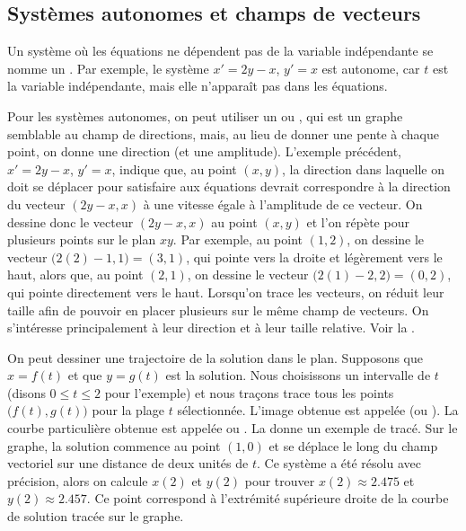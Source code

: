 \subsection{Systèmes autonomes et champs de vecteurs}

Un système où les équations ne dépendent pas de la variable indépendante se nomme un \emph{}. Par exemple, le système $x'=2y-x$, $y'=x$ est autonome, car $t$ est la variable indépendante, mais elle n'apparaît pas dans les équations.

Pour les systèmes autonomes, on peut utiliser un
\emph{} ou \emph{},
qui est un graphe semblable au champ de directions, mais, au lieu de donner une pente à chaque point, on donne une direction (et une amplitude). L'exemple précédent, $x' = 2y-x$, $y' = x$, indique que, au point $(x,y)$, la direction dans laquelle on doit se déplacer pour satisfaire aux équations devrait correspondre à la direction du vecteur $( 2y-x, x )$
à une vitesse égale à l'amplitude de ce vecteur. On dessine donc le vecteur $(2y-x,x)$ au point $(x,y)$ et l'on répète pour plusieurs points sur le plan $xy$.
Par exemple, au point $(1,2)$, on dessine le vecteur
$\bigl(2(2)-1,1\bigr) = (3,1)$,
qui pointe vers la droite et légèrement vers le haut, alors que, au point $(2,1)$, on dessine le vecteur $\bigl(2(1)-2,2\bigr) = (0,2)$,
qui pointe directement vers le haut.
Lorsqu'on trace les vecteurs, on réduit leur taille afin de pouvoir en placer plusieurs sur le même champ de vecteurs. On s'intéresse principalement à leur direction et à leur taille relative. Voir la
.

On peut dessiner une trajectoire de la solution dans le plan. Supposons que $x = f(t)$ et que $y=g(t)$ est la solution. Nous choisissons un intervalle de $t$ (disons $0 \leq t \leq 2$ pour l'exemple) et nous traçons trace tous les points
$\bigl(f(t),g(t)\bigr)$ pour la plage $t$ sélectionnée. L'image obtenue est appelée \emph{}
(ou \emph{}).
La courbe particulière obtenue est appelée \emph{} ou \emph{}.
La  donne un exemple de tracé.
Sur le graphe, la solution commence au point $(1,0)$ et se déplace le long du champ vectoriel sur une distance de deux unités de $t$. Ce système a été résolu avec précision, alors on calcule $x(2)$ et $y(2)$ pour trouver
$x(2) \approx 2.475$ et $y(2) \approx 2.457$. Ce point correspond à l'extrémité supérieure droite de la courbe de solution tracée sur le graphe.

